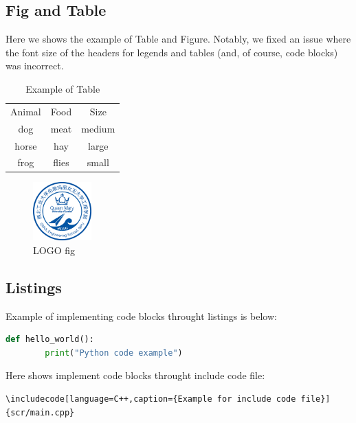 \documentclass{qmes-template}
\begin{document}
\subsection{Fig and Table}
Here we shows the example of Table and Figure. Notably, we fixed an issue where
the font size of the headers for legends and tables (and, of course, code
blocks) was incorrect.
\begin{table}[h!]
    \centering
    \caption{Example of Table}
    \label{table:1}
    \begin{tabular}{ccc}
        \midrule
        Animal & Food  & Size   \\
        \cmidrule(lr){1-3}
        dog    & meat  & medium \\
        horse  & hay   & large  \\
        frog   & flies & small  \\
        \midrule
    \end{tabular}
\end{table}

\begin{figure}[ht]
    \centering
    \includegraphics[width=0.2\textwidth]{./figure/LOGO.jpg}
    \caption{LOGO fig}
\end{figure}

\subsection{Listings}
Example of implementing code blocks throught listings is below:


\begin{lstlisting}[language=Python,caption={Example Code 2}] 
    def hello_world():
        print("Python code example") 
\end{lstlisting}

Here shows implement code blocks throught include code file:
\begin{lstlisting}[caption={The Implementing of Code Block Below}]
\includecode[language=C++,caption={Example for include code file}]{scr/main.cpp}
\end{lstlisting}
\end{document}
